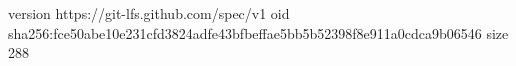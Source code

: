 version https://git-lfs.github.com/spec/v1
oid sha256:fce50abe10e231cfd3824adfe43bfbeffae5bb5b52398f8e911a0cdca9b06546
size 288
